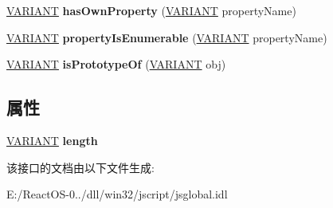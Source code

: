 \begin{DoxyCompactItemize}
\hyperlink{structtag_v_a_r_i_a_n_t}{V\+A\+R\+I\+A\+NT} {\bfseries has\+Own\+Property} (\hyperlink{structtag_v_a_r_i_a_n_t}{V\+A\+R\+I\+A\+NT} property\+Name)
\item 
\mbox{\label{interface_j_s_global_1_1_function_instance_a21e9cfc8cadafc911b3452ee82a28ec1}} 
\hyperlink{structtag_v_a_r_i_a_n_t}{V\+A\+R\+I\+A\+NT} {\bfseries property\+Is\+Enumerable} (\hyperlink{structtag_v_a_r_i_a_n_t}{V\+A\+R\+I\+A\+NT} property\+Name)
\item 
\mbox{\label{interface_j_s_global_1_1_function_instance_af75df1f0d59ca2cb5ab9570e64af5b92}} 
\hyperlink{structtag_v_a_r_i_a_n_t}{V\+A\+R\+I\+A\+NT} {\bfseries is\+Prototype\+Of} (\hyperlink{structtag_v_a_r_i_a_n_t}{V\+A\+R\+I\+A\+NT} obj)
\end{DoxyCompactItemize}
\subsection*{属性}
\begin{DoxyCompactItemize}
\item 
\mbox{\label{interface_j_s_global_1_1_function_instance_a5ce036d93ab84b24647d368e27a6d04f}} 
\hyperlink{structtag_v_a_r_i_a_n_t}{V\+A\+R\+I\+A\+NT} {\bfseries length}
\end{DoxyCompactItemize}


该接口的文档由以下文件生成\+:\begin{DoxyCompactItemize}
\item 
E\+:/\+React\+O\+S-\/0../dll/win32/jscript/jsglobal.\+idl\end{DoxyCompactItemize}
